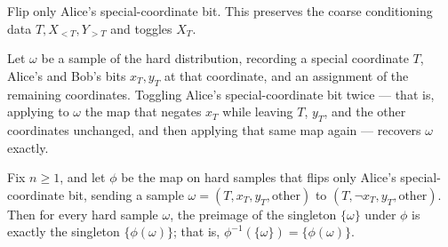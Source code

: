 \begin{definition}[Flipspecialx]
\label{CommunicationComplexity.Functions.Disjointness.RandomizedLowerBound.flipSpecialX}
\leanok
{}
Flip only Alice's special-coordinate bit.  This preserves the coarse conditioning data $T, X_{<T}, Y_{>T}$ and toggles $X_{T}$.
\end{definition}

\begin{theorem}
\label{CommunicationComplexity.Functions.Disjointness.RandomizedLowerBound.flipSpecialX_flipSpecialX}
\leanok
{}
Let $\omega$ be a sample of the hard distribution, recording a special coordinate $T$,
Alice's and Bob's bits $x_T, y_T$ at that coordinate, and an assignment of the remaining
coordinates. Toggling Alice's special-coordinate bit twice — that is, applying to
$\omega$ the map that negates $x_T$ while leaving $T$, $y_T$, and the other coordinates
unchanged, and then applying that same map again — recovers $\omega$ exactly.
\end{theorem}

\begin{theorem}
\label{CommunicationComplexity.Functions.Disjointness.RandomizedLowerBound.flipSpecialX_preimage_singleton}
\leanok
{}
Fix $n \ge 1$, and let $\phi$ be the map on hard samples that flips only Alice's
special-coordinate bit, sending a sample $\omega = (T, x_T, y_T, \mathrm{other})$ to
$(T, \lnot x_T, y_T, \mathrm{other})$. Then for every hard sample $\omega$, the preimage
of the singleton $\{\omega\}$ under $\phi$ is exactly the singleton $\{\phi(\omega)\}$;
that is, $\phi^{-1}(\{\omega\}) = \{\phi(\omega)\}$.
\end{theorem}

